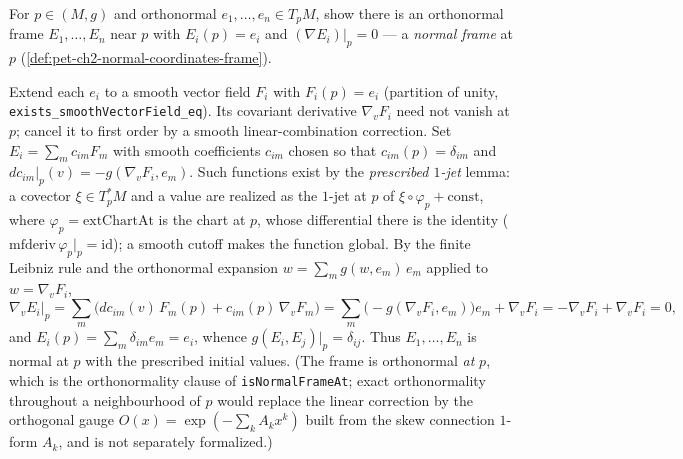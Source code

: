 \begin{remark}
  \label{rem:pet-ch2-ex-19}
  \leanok
  For $p\in(M,g)$ and orthonormal $e_1,\dots,e_n\in T_pM$, show there is an
  orthonormal frame $E_1,\dots,E_n$ near $p$ with $E_i(p)=e_i$ and
  $(\nabla E_i)|_p=0$ — a \emph{normal frame} at $p$
  (\cref{def:pet-ch2-normal-coordinates-frame}).

  Extend each $e_i$ to a smooth vector field $F_i$ with $F_i(p)=e_i$ (partition
  of unity, \texttt{exists\_smoothVectorField\_eq}). Its covariant derivative
  $\nabla_vF_i$ need not vanish at $p$; cancel it to first order by a smooth
  linear-combination correction. Set $E_i=\sum_m c_{im}F_m$ with smooth
  coefficients $c_{im}$ chosen so that $c_{im}(p)=\delta_{im}$ and
  $dc_{im}|_p(v)=-g(\nabla_vF_i,e_m)$. Such functions exist by the
  \emph{prescribed $1$-jet} lemma: a covector $\xi\in T_p^*M$ and a value are
  realized as the $1$-jet at $p$ of $\xi\circ\varphi_p+\text{const}$, where
  $\varphi_p=\mathrm{extChartAt}$ is the chart at $p$, whose differential there
  is the identity ($\mathrm{mfderiv}\,\varphi_p|_p=\mathrm{id}$); a smooth cutoff
  makes the function global. By the finite Leibniz rule and the orthonormal
  expansion $w=\sum_m g(w,e_m)\,e_m$ applied to $w=\nabla_vF_i$,
  \[
    \nabla_vE_i|_p
      =\sum_m\big(dc_{im}(v)\,F_m(p)+c_{im}(p)\,\nabla_vF_m\big)
      =\sum_m\big({-}g(\nabla_vF_i,e_m)\big)e_m+\nabla_vF_i
      =-\nabla_vF_i+\nabla_vF_i=0 ,
  \]
  and $E_i(p)=\sum_m\delta_{im}e_m=e_i$, whence $g(E_i,E_j)|_p=\delta_{ij}$. Thus
  $E_1,\dots,E_n$ is normal at $p$ with the prescribed initial values. (The frame
  is orthonormal \emph{at} $p$, which is the orthonormality clause of
  \texttt{isNormalFrameAt}; exact orthonormality throughout a neighbourhood of
  $p$ would replace the linear correction by the orthogonal gauge
  $O(x)=\exp(-\sum_k A_k x^k)$ built from the skew connection $1$-form $A_k$, and
  is not separately formalized.)
\end{remark}

